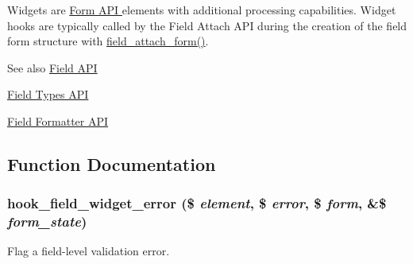 Widgets are \hyperlink{}{Form API } elements with additional processing capabilities. Widget hooks are typically called by the Field Attach API during the creation of the field form structure with \hyperlink{group__field__attach_gac5bd0213dae78f7c1b3235f3acdde2c6}{field\_\-attach\_\-form()}.

\begin{DoxySeeAlso}{See also}
\hyperlink{group__field}{Field API} 

\hyperlink{group__field__types}{Field Types API} 

\hyperlink{group__field__formatter}{Field Formatter API} 
\end{DoxySeeAlso}


\subsection{Function Documentation}
\hypertarget{group__field__widget_ga9a2031578542fef9e296d79c946431fd}{
\subsubsection[{hook\_\-field\_\-widget\_\-error}]{\setlength{\rightskip}{0pt plus 5cm}hook\_\-field\_\-widget\_\-error (\$ {\em element}, \/  \$ {\em error}, \/  \$ {\em form}, \/  \&\$ {\em form\_\-state})}}
\label{group__field__widget_ga9a2031578542fef9e296d79c946431fd}
Flag a field-\/level validation error.


